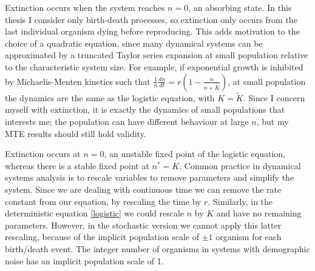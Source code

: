 Extinction occurs when the system reaches $n=0$, an absorbing state. %
In this thesis I consider only birth-death processes, so extinction only occurs from the last individual organism dying before reproducing. 
This adds motivation to the choice of a quadratic equation, since many dynamical systems can be approximated by a truncated Taylor series expansion at small population relative to the characteristic system size. 
For example, if exponential growth is inhibited by Michaelis-Menten kinetics such that $\frac{1}{n}\frac{dn}{dt} = r\left(1-\frac{n}{n+\tilde{K}}\right)$, at small population the dynamics are the same as the logistic equation, with $K=\tilde{K}$. 
Since I concern myself with extinction, it is exactly the dynamics of small populations that interests me; the population can have different behaviour at large $n$, but my MTE results should still hold validity. 

Extinction occurs at $n=0$, an unstable fixed point of the logistic equation, whereas there is a stable fixed point at $n^*=K$. 
Common practice in dynamical systems analysis is to rescale variables to remove parameters and simplify the system. 
Since we are dealing with continuous time we can remove the rate constant from our equation, by rescaling the time by $r$. 
Similarly, in the deterministic equation \ref{logistic} we could rescale $n$ by $K$ and have no remaining parameters. 
However, in the stochastic version we cannot apply this latter rescaling, because of the implicit population scale of $\pm1$ organism for each birth/death event. 
The integer number of organisms in systems with demographic noise has an implicit population scale of 1. 

